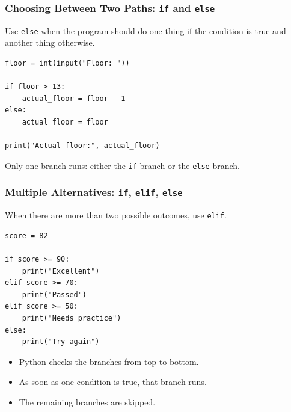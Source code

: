 \documentclass[aspectratio=169,10pt]{beamer}
\newcommand{\myitem}[1]{\item #1\vspace{0.04cm}}
\begin{document}
\begin{frame}[fragile]
\frametitle{Choosing Between Two Paths: \texttt{if} and \texttt{else}}
\begin{tcolorbox}[lecturebox,title=Key idea]
Use \texttt{else} when the program should do one thing if the condition is true and another thing otherwise.
\end{tcolorbox}

\begin{lstlisting}[style=pycode]
floor = int(input("Floor: "))

if floor > 13:
    actual_floor = floor - 1
else:
    actual_floor = floor

print("Actual floor:", actual_floor)
\end{lstlisting}

\begin{tcolorbox}[lecturebox,title=Flow of control]
Only one branch runs: either the \texttt{if} branch or the \texttt{else} branch.
\end{tcolorbox}
\end{frame}


\begin{frame}[fragile]
\frametitle{Multiple Alternatives: \texttt{if}, \texttt{elif}, \texttt{else}}
When there are more than two possible outcomes, use \texttt{elif}.

\begin{lstlisting}[style=pycodesmall]
score = 82

if score >= 90:
    print("Excellent")
elif score >= 70:
    print("Passed")
elif score >= 50:
    print("Needs practice")
else:
    print("Try again")
\end{lstlisting}

\begin{itemize}\setlength\itemsep{0cm}
  \myitem{Python checks the branches from top to bottom.}
  \myitem{As soon as one condition is true, that branch runs.}
  \myitem{The remaining branches are skipped.}
\end{itemize}
\end{frame}
\end{document}
